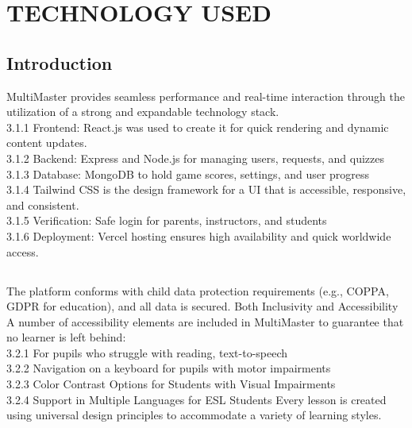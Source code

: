 \documentclass[BTech]{audiss}
\begin{document}
\newpage
\section{TECHNOLOGY USED}
\subsection{Introduction}
MultiMaster provides seamless performance and real-time interaction through the utilization of a strong and expandable technology stack.\\
3.1.1 Frontend: React.js was used to create it for quick rendering and dynamic content updates.\\
3.1.2 Backend: Express and Node.js for managing users, requests, and quizzes\\
3.1.3 Database: MongoDB to hold game scores, settings, and user progress\\ 3.1.4 Tailwind CSS is the design framework for a UI that is accessible, responsive, and consistent.\\
3.1.5 Verification: Safe login for parents, instructors, and students\\
3.1.6 Deployment: Vercel hosting ensures high availability and quick worldwide access.\\

\subsection{}
The platform conforms with child data protection requirements (e.g., COPPA, GDPR for education), and all data is secured. Both Inclusivity and Accessibility A number of accessibility elements are included in MultiMaster to guarantee that no learner is left behind:\\
3.2.1 For pupils who struggle with reading, text-to-speech \\
3.2.2 Navigation on a keyboard for pupils with motor impairments \\
3.2.3 Color Contrast Options for Students with Visual Impairments\\
3.2.4 Support in Multiple Languages for ESL Students Every lesson is created using universal design principles to accommodate a variety of learning styles.
\end{document}
